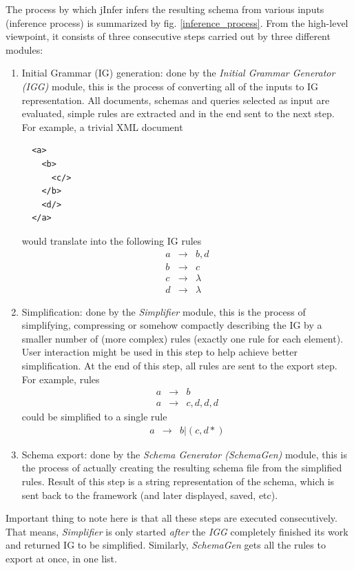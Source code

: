 \documentclass[a4paper,10pt,oneside]{article}
\newcommand{\jmodule}[1]{\emph{#1}}
\begin{document}
The process by which jInfer infers the resulting schema from various inputs (inference process) is summarized by fig. \ref{inference_process}. From the high-level viewpoint, it consists of three consecutive steps carried out by three different modules:
\begin{enumerate}
	\item Initial Grammar (IG) generation: done by the \jmodule{Initial Grammar Generator (IGG)} module, this is the process of converting all of the inputs to IG representation. All documents, schemas and queries selected as input are evaluated, simple rules are extracted and in the end sent to the next step.\\
	For example, a trivial XML document
	\begin{verbatim}
  <a>
    <b>
      <c/>
    </b>
    <d/>
  </a>
	\end{verbatim}
	would translate into the following IG rules
	\begin{eqnarray*}
		a & \to &  b, d \\
		b & \to & c \\
		c & \to & \lambda \\
		d & \to & \lambda 
	\end{eqnarray*}
	\item Simplification: done by the \jmodule{Simplifier} module, this is the process of simplifying, compressing or somehow compactly describing the IG by a smaller number of (more complex) rules (exactly one rule for each element). User interaction might be used in this step to help achieve better simplification. At the end of this step, all rules are sent to the export step.\\
	For example, rules
	\begin{eqnarray*}
		a & \to & b \\
		a & \to & c, d, d, d
	\end{eqnarray*}
	could be simplified to a single rule
	\begin{eqnarray*}
		a & \to & b | (c, d\ast)
	\end{eqnarray*}
	\item Schema export: done by the \jmodule{Schema Generator (SchemaGen)} module, this is the process of actually creating the resulting schema file from the simplified rules. Result of this step is a string representation of the schema, which is sent back to the framework (and later displayed, saved, etc).\\
\end{enumerate}
Important thing to note here is that all these steps are executed consecutively. That means, \jmodule{Simplifier} is only started \emph{after} the \jmodule{IGG} completely finished its work and returned IG to be simplified. Similarly, \jmodule{SchemaGen} gets all the rules to export at once, in one list.\\
\end{document}
